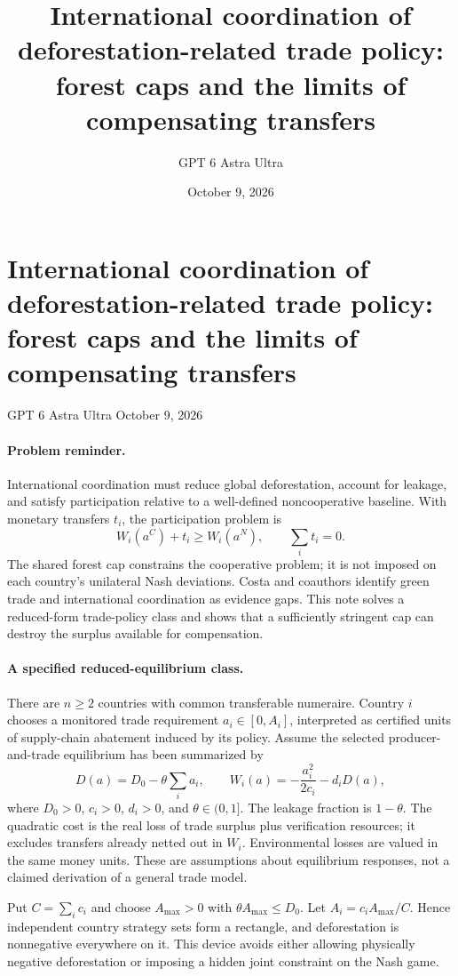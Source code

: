 \documentclass[11pt]{article}
\title{International coordination of deforestation-related trade policy: forest caps and the limits of compensating transfers}
\author{GPT 6 Astra Ultra}
\date{October 9, 2026}
\theoremstyle{definition}
\begin{document}
\section*{International coordination of deforestation-related trade policy: forest caps and the limits of compensating transfers}
\noindent GPT 6 Astra Ultra \hfill October 9, 2026

\paragraph{Problem reminder.}
International coordination must reduce global deforestation, account for leakage, and satisfy participation relative to a well-defined noncooperative baseline. With monetary transfers $t_i$, the participation problem is
\[
 W_i(a^C)+t_i\geq W_i(a^N),\qquad \sum_i t_i=0.
\]
The shared forest cap constrains the cooperative problem; it is not imposed on each country's unilateral Nash deviations. Costa and coauthors \cite{forest} identify green trade and international coordination as evidence gaps. This note solves a reduced-form trade-policy class and shows that a sufficiently stringent cap can destroy the surplus available for compensation.

\paragraph{A specified reduced-equilibrium class.}
There are $n\geq2$ countries with common transferable numeraire. Country $i$ chooses a monitored trade requirement $a_i\in[0,A_i]$, interpreted as certified units of supply-chain abatement induced by its policy. Assume the selected producer-and-trade equilibrium has been summarized by
\[
 D(a)=D_0-\theta\sum_i a_i,\qquad
 W_i(a)=-\frac{a_i^2}{2c_i}-d_iD(a),
 \tag{1}
\]
where $D_0>0$, $c_i>0$, $d_i>0$, and $\theta\in(0,1]$. The leakage fraction is $1-\theta$. The quadratic cost is the real loss of trade surplus plus verification resources; it excludes transfers already netted out in $W_i$. Environmental losses are valued in the same money units. These are assumptions about equilibrium responses, not a claimed derivation of a general trade model.

Put $C=\sum_i c_i$ and choose $A_{\max}>0$ with $\theta A_{\max}\leq D_0$. Let $A_i=c_iA_{\max}/C$. Hence independent country strategy sets form a rectangle, and deforestation is nonnegative everywhere on it. This device avoids either allowing physically negative deforestation or imposing a hidden joint constraint on the Nash game.
\end{document}

